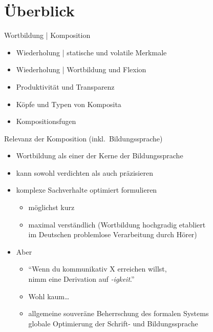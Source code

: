 \section{Überblick}

\begin{frame}
  {Wortbildung | Komposition}
  \onslide<+->
  \begin{itemize}[<+->]
    \item Wiederholung | statische und volatile Merkmale
    \item Wiederholung | Wortbildung und Flexion
      \Zeile
    \item Produktivität und Transparenz
    \item Köpfe und Typen von Komposita
    \item Kompositionsfugen
  \end{itemize}
\end{frame}

\begin{frame}
  {Relevanz der Komposition (inkl.\ Bildungssprache)}
  \pause
  \begin{itemize}[<+->]
    \item Wortbildung als einer der Kerne der Bildungssprache
    \item kann sowohl \alert{verdichten} als auch \alert{präzisieren}
    \Halbzeile
    \item komplexe Sachverhalte \alert{optimiert} formulieren
      \begin{itemize}[<+->]
        \item möglichst kurz
        \item maximal verständlich (Wortbildung hochgradig etabliert\\
          im Deutschen  problemlose Verarbeitung durch Hörer)
      \end{itemize}
      \Halbzeile
    \item Aber 
      \Halbzeile
      \begin{itemize}[<+->]
        \item "`Wenn du kommunikativ X erreichen willst,\\
          nimm eine Derivation auf \textit{-igkeit}."'
        \item \alert{Wohl kaum\ldots}
        \item \alert{allgemeine souveräne Beherrschung des formalen Systems \\
          globale Optimierung der Schrift- und Bildungssprache}
      \end{itemize}
  \end{itemize}
\end{frame}

